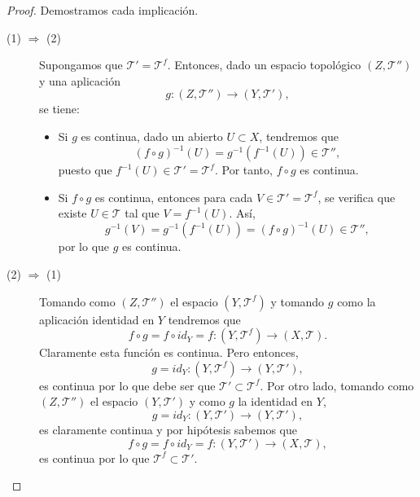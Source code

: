 \begin{proof}
Demostramos cada implicación.
\begin{description}
\item[(1) $\displaystyle \Rightarrow $ (2)] Supongamos que $\displaystyle \mathcal{T}' = \mathcal{T}^{f} $. Entonces, dado un espacio topológico $\displaystyle \left(Z, \mathcal{T}''\right) $ y una aplicación
	\[g : \left(Z, \mathcal{T}''\right)\to \left(Y, \mathcal{T}'\right) ,\]
	se tiene:
	\begin{itemize}
	\item Si $\displaystyle g $ es continua, dado un abierto $\displaystyle U \subset X $, tendremos que 
		\[\left(f\circ g\right)^{-1}\left(U\right)=g^{-1}\left(f^{-1}\left(U\right)\right)\in \mathcal{T}'' ,\]
		puesto que $\displaystyle f^{-1}\left(U\right)\in \mathcal{T}' =\mathcal{T}^{f} $. Por tanto, $\displaystyle f\circ g $ es continua. 
	\item Si $\displaystyle f\circ g $ es continua, entonces para cada $\displaystyle V \in \mathcal{T}'=\mathcal{T}^{f} $, se verifica que existe $\displaystyle U \in \mathcal{T} $ tal que $\displaystyle V = f^{-1}\left(U\right) $. Así, 
		\[g^{-1}\left(V\right)=g^{-1}\left(f^{-1}\left(U\right)\right)=\left(f\circ g\right)^{-1}\left(U\right)\in \mathcal{T}'' ,\]
		por lo que $\displaystyle g $ es continua. 
	\end{itemize}
\item[(2) $\displaystyle \Rightarrow $ (1)] Tomando como $\displaystyle \left(Z, \mathcal{T}''\right) $ el espacio $\displaystyle \left(Y, \mathcal{T}^{f}\right) $ y tomando $\displaystyle g $ como la aplicación identidad en $\displaystyle Y $ tendremos que 
	\[f\circ g = f\circ id_Y = f : \left(Y, \mathcal{T}^{f}\right)\to \left(X, \mathcal{T}\right) .\]
	Claramente esta función es continua. Pero entonces, 
	\[g = id_Y : \left(Y, \mathcal{T}^{f}\right)\to \left(Y, \mathcal{T}'\right) ,\]
	es continua por lo que debe ser que $\displaystyle \mathcal{T}' \subset \mathcal{T}^{f} $. Por otro lado, tomando como $\displaystyle \left(Z, \mathcal{T}''\right) $ el espacio $\displaystyle \left(Y, \mathcal{T}'\right) $ y como $\displaystyle g $ la identidad en $\displaystyle Y $, 
	\[g =id_Y : \left(Y, \mathcal{T}'\right) \to \left(Y, \mathcal{T}'\right) ,\]
	es claramente continua y por hipótesis sabemos que 
	\[f\circ g = f\circ id_Y = f : \left(Y, \mathcal{T}'\right)\to \left(X, \mathcal{T}\right) ,\]
	es continua por lo que $\displaystyle \mathcal{T}^{f}\subset \mathcal{T}' $. 
\end{description}
\end{proof}


